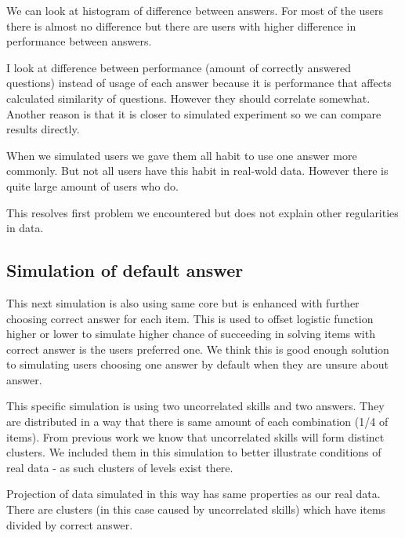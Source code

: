 \documentclass[
  digital, %
  table,   %
  nolof,     %
  nolot,     %
  nocover
]{fithesis3}
\begin{document}
We can look at histogram of difference between answers. For most of the
users there is almost no difference but there are users with higher
difference in performance between answers.


I look at difference between performance (amount of correctly answered
questions) instead of usage of each answer because it is performance
that affects calculated similarity of questions. However they should
correlate somewhat. Another reason is that it is closer to simulated
experiment so we can compare results directly.

When we simulated users we gave them all habit to use one answer more
commonly. But not all users have this habit in real-wold data. However
there is quite large amount of users who do.

This resolves first problem we encountered but does not explain other
regularities in data.

\subsection{Simulation of default answer}\label{simulation-of-default-answer}

This next simulation is also using same core but is enhanced with further choosing correct answer for each item. This is used to offset logistic function higher or lower to simulate higher chance of succeeding in solving items with correct answer is the users preferred one. We think this is good enough solution to simulating users choosing one answer by default when they are unsure about answer.

This specific simulation is using two uncorrelated skills and two answers. They are distributed in a way that there is same amount of each combination (1/4 of items). From previous work we know that uncorrelated skills will form distinct clusters. We included them in this simulation to better illustrate conditions of real data - as such clusters of levels exist there.

Projection of data simulated in this way has same properties as our real data. There are clusters (in this case caused by uncorrelated skills) which have items divided by correct answer.

\end{document}
